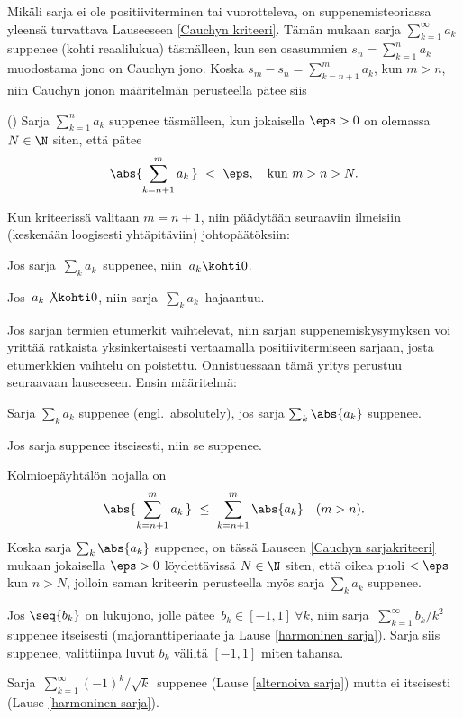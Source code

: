 Mikäli sarja ei ole positiiviterminen tai vuorotteleva, on suppenemisteoriassa yleensä
turvattava Lauseeseen \ref{Cauchyn kriteeri}. Tämän mukaan sarja $\sum_{k=1}^\infty a_k$
suppenee  (kohti reaalilukua) täsmälleen, kun sen osasummien $s_n = \sum_{k=1}^n a_k$
muodostama jono on Cauchyn jono. Koska $s_m - s_n = \sum_{k=n+1}^m a_k$, kun $m>n$, niin
Cauchyn jonon määritelmän perusteella pätee siis
\begin{Lause} () \label{Cauchyn sarjakriteeri}
 Sarja $\sum_{k=1}^n a_k$ suppenee täsmälleen, kun
jokaisella $\eps > 0$ on olemassa $N \in \N$ siten, että pätee
\[ 
\abs{\sum_{k=n+1}^m a_k\,}\ <\ \eps, \quad \text{kun}\ m>n>N. 
\] 
\end{Lause}
Kun kriteerissä valitaan $m=n+1$, niin päädytään seuraaviin ilmeisiin (keskenään loogisesti
yhtäpitäviin) johtopäätöksiin:
\begin{Kor} \label{Cauchyn korollaari 1} Jos sarja $\,\sum_k a_k\,$ suppenee,
niin $\,a_k \kohti 0$. 
\end{Kor}
\begin{Kor} \label{Cauchyn korollaari 2} Jos $\,a_k \not\kohti 0$, niin sarja 
$\,\sum_k a_k\,$ hajaantuu. 
\end{Kor}
Jos sarjan termien etumerkit vaihtelevat, niin sarjan suppenemiskysymyksen voi yrittää
ratkaista yksinkertaisesti vertaamalla positiivitermiseen sarjaan, josta etumerkkien vaihtelu
on poistettu. Onnistuessaan tämä yritys perustuu seuraavaan lauseeseen. Ensin määritelmä:
\begin{Def}  Sarja $\sum_k a_k$ suppenee 
(engl.\ absolutely), jos sarja $\sum_k \abs{a_k}$ suppenee.
\end{Def}
\begin{Lause} Jos sarja suppenee itseisesti, niin se suppenee. 
\end{Lause}
\tod Kolmioepäyhtälön nojalla on
\[ 
\abs{\sum_{k=n+1}^m a_k\,}\ \le\ \sum_{k=n+1}^m \abs{a_k} \quad (m>n). 
\]
Koska sarja $\sum_k \abs{a_k}$ suppenee, on tässä Lauseen \ref{Cauchyn sarjakriteeri} mukaan
jokaisella $\eps > 0$ löydettävissä $N \in \N$ siten, että oikea puoli $< \eps$ kun $n>N$, 
jolloin saman kriteerin perusteella myös sarja $\sum_k a_k$ suppenee. \loppu
\begin{Exa} Jos $\seq{b_k}$ on lukujono, jolle pätee $\,b_k \in [-1,1]\ \forall k$, niin sarja
\linebreak $\ \sum_{k=1}^\infty b_k/k^2$ suppenee itseisesti (majoranttiperiaate ja Lause 
\ref{harmoninen sarja}). Sarja siis suppenee, valittiinpa luvut $b_k$ väliltä $[-1,1]$ miten
tahansa. \loppu
\end{Exa}
\begin{Exa} Sarja $\,\sum_{k=1}^\infty (-1)^k/\sqrt{k}\,$ suppenee
(Lause \ref{alternoiva sarja}) mutta ei itseisesti (Lause \ref{harmoninen sarja}). \loppu
\end{Exa}

